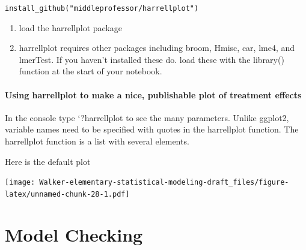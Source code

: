 \documentclass[]{book}
\newenvironment{Shaded}{\begin{snugshade}}{\end{snugshade}}
\newcommand{\KeywordTok}[1]{\textcolor[rgb]{0.13,0.29,0.53}{\textbf{#1}}}
\newcommand{\DataTypeTok}[1]{\textcolor[rgb]{0.13,0.29,0.53}{#1}}
\newcommand{\StringTok}[1]{\textcolor[rgb]{0.31,0.60,0.02}{#1}}
\newcommand{\CommentTok}[1]{\textcolor[rgb]{0.56,0.35,0.01}{\textit{#1}}}
\newcommand{\OperatorTok}[1]{\textcolor[rgb]{0.81,0.36,0.00}{\textbf{#1}}}
\newcommand{\NormalTok}[1]{#1}
\providecommand{\tightlist}{%
  \setlength{\itemsep}{0pt}\setlength{\parskip}{0pt}}
\begin{document}
\texttt{install\_github("middleprofessor/harrellplot")}

\begin{enumerate}
\def\labelenumi{\arabic{enumi}.}
\setcounter{enumi}{2}
\tightlist
\item
  load the harrellplot package
\item
  harrellplot requires other packages including broom, Hmisc, car, lme4,
  and lmerTest. If you haven't installed these do. load these with the
  library() function at the start of your notebook.
\end{enumerate}

\subsubsection{Using harrellplot to make a nice, publishable plot of
treatment
effects}\label{using-harrellplot-to-make-a-nice-publishable-plot-of-treatment-effects}

In the console type `?harrellplot to see the many parameters. Unlike
ggplot2, variable names need to be specified with quotes in the
harrellplot function. The harrellplot function is a list with several
elements.

Here is the default plot

\begin{Shaded}
\end{Shaded}

\texttt{[image: Walker-elementary-statistical-modeling-draft\_files/figure-latex/unnamed-chunk-28-1.pdf]}

\chapter{Model Checking}\label{model-checking-1}
\end{document}
